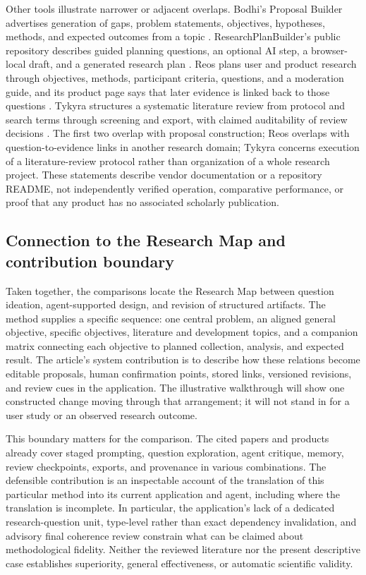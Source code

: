 Other tools illustrate narrower or adjacent overlaps. Bodhi's Proposal Builder advertises generation of gaps, problem statements, objectives, hypotheses, methods, and expected outcomes from a topic \cite{bodhi2026proposal}. ResearchPlanBuilder's public repository describes guided planning questions, an optional AI step, a browser-local draft, and a generated research plan \cite{vallavaraj2026builder}. Reos plans user and product research through objectives, methods, participant criteria, questions, and a moderation guide, and its product page says that later evidence is linked back to those questions \cite{reos2026plan}. Tykyra structures a systematic literature review from protocol and search terms through screening and export, with claimed auditability of review decisions \cite{tykyra2026site}. The first two overlap with proposal construction; Reos overlaps with question-to-evidence links in another research domain; Tykyra concerns execution of a literature-review protocol rather than organization of a whole research project. These statements describe vendor documentation or a repository README, not independently verified operation, comparative performance, or proof that any product has no associated scholarly publication.

\subsection{Connection to the Research Map and contribution boundary}

Taken together, the comparisons locate the Research Map between question ideation, agent-supported design, and revision of structured artifacts. The method supplies a specific sequence: one central problem, an aligned general objective, specific objectives, literature and development topics, and a companion matrix connecting each objective to planned collection, analysis, and expected result. The article's system contribution is to describe how these relations become editable proposals, human confirmation points, stored links, versioned revisions, and review cues in the application. The illustrative walkthrough will show one constructed change moving through that arrangement; it will not stand in for a user study or an observed research outcome.

This boundary matters for the comparison. The cited papers and products already cover staged prompting, question exploration, agent critique, memory, review checkpoints, exports, and provenance in various combinations. The defensible contribution is an inspectable account of the translation of this particular method into its current application and agent, including where the translation is incomplete. In particular, the application's lack of a dedicated research-question unit, type-level rather than exact dependency invalidation, and advisory final coherence review constrain what can be claimed about methodological fidelity. Neither the reviewed literature nor the present descriptive case establishes superiority, general effectiveness, or automatic scientific validity.
